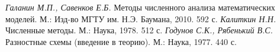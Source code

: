 \documentclass[12pt, a4paper]{article}
\begin{document}
	
	\clearpage
	\begin{thebibliography}{1}
		 \textit{Галанин М.П., Савенков Е.Б.} Методы численного анализа математических\\ моделей. М.: Изд-во МГТУ им. Н.Э. Баумана,	2010. 592 с.
		 \textit{Калиткин Н.Н.} Численные методы. М.: Наука, 1978. 512 с.
		 \textit{Годунов С.К., Рябенький В.С.} Разностные схемы (введение в теорию). М.: Наука, 1977. 440 с.
		
		
	\end{thebibliography}
	
	
\end{document}
